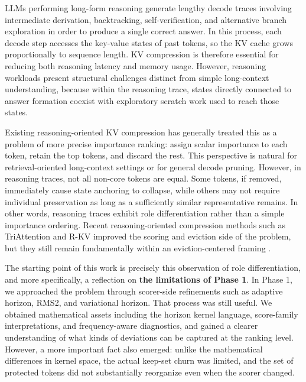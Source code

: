 LLMs performing long-form reasoning generate lengthy decode traces involving intermediate derivation, backtracking, self-verification, and alternative branch exploration in order to produce a single correct answer. In this process, each decode step accesses the key-value states of past tokens, so the KV cache grows proportionally to sequence length. KV compression is therefore essential for reducing both reasoning latency and memory usage. However, reasoning workloads present structural challenges distinct from simple long-context understanding, because within the reasoning trace, states directly connected to answer formation coexist with exploratory scratch work used to reach those states.


Existing reasoning-oriented KV compression has generally treated this as a problem of more precise importance ranking: assign scalar importance to each token, retain the top tokens, and discard the rest. This perspective is natural for retrieval-oriented long-context settings or for general decode pruning. However, in reasoning traces, not all non-core tokens are equal. Some tokens, if removed, immediately cause state anchoring to collapse, while others may not require individual preservation as long as a sufficiently similar representative remains. In other words, reasoning traces exhibit role differentiation rather than a simple importance ordering. Recent reasoning-oriented compression methods such as TriAttention and R-KV improved the scoring and eviction side of the problem, but they still remain fundamentally within an eviction-centered framing \citep{mao2026triattention,cai2025rkv}.


The starting point of this work is precisely this observation of role differentiation, and more specifically, a reflection on \textbf{the limitations of Phase 1}. In Phase 1, we approached the problem through scorer-side refinements such as adaptive horizon, RMS2, and variational horizon. That process was still useful. We obtained mathematical assets including the horizon kernel language, score-family interpretations, and frequency-aware diagnostics, and gained a clearer understanding of what kinds of deviations can be captured at the ranking level. However, a more important fact also emerged: unlike the mathematical differences in kernel space, the actual keep-set churn was limited, and the set of protected tokens did not substantially reorganize even when the scorer changed.


